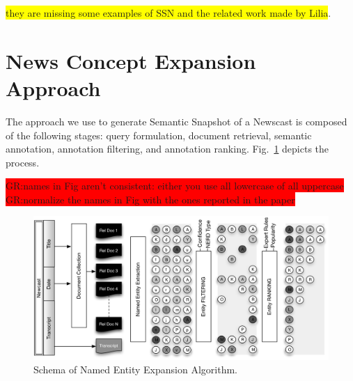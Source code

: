 \documentclass{llncs}
\newcommand{\hg}[1]{\colorbox{yellow}{#1}}
\newcommand{\todo}[1]{\colorbox{red}{#1}}
\begin{document}
\hg{they are missing some examples of SSN and the related work made by Lilia}.

\section{News Concept Expansion Approach}
\label{sec:ConceptExpansion}
The approach we use to generate Semantic Snapshot of a Newscast is composed of the following stages: query formulation, document retrieval, semantic annotation, annotation filtering, and annotation ranking. Fig.~\ref{fig:namedEntityExpansion} depicts the process.

\todo{GR:names in Fig aren't consistent: either you use all lowercase of all uppercase}
\todo{GR:normalize the names in Fig with the ones reported in the paper}
\begin{figure}[h!]
\centering
\includegraphics[width=1\textwidth]{figure/ExpansionDiagram}
\caption{Schema of Named Entity Expansion Algorithm.}
\label{fig:namedEntityExpansion}%
\end{figure}
\end{document}
